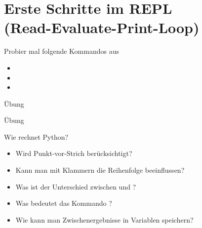 \section{Erste Schritte im REPL \\ \footnotesize (Read-Evaluate-Print-Loop)}


\begin{frame}
\begin{block}{Probier mal folgende Kommandos aus}	
	\begin{itemize}
		\item {}
		\item {}
		\item {}
	\end{itemize}
\end{block}	
\end{frame}



\begin{frame}{Übung}

\end{frame}

\begin{frame}{Übung}
	\begin{block}{Wie rechnet Python?}
		\begin{itemize}
			\item Wird Punkt-vor-Strich berücksichtigt?
			\item Kann man mit Klammern die Reihenfolge beeinflussen?
			\item Was ist der Unterschied zwischen  und  ?
			\item Was bedeutet das Kommando \py{_}? 
			\item Wie kann man Zwischenergebnisse in Variablen speichern?
		\end{itemize}
	\end{block}
\end{frame}

